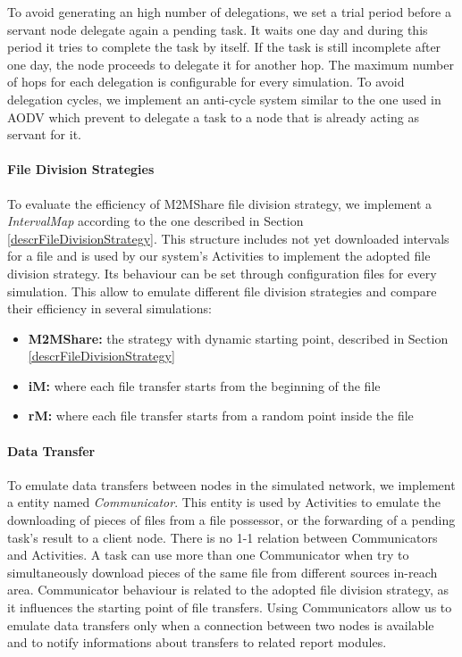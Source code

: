 To avoid generating an high number of delegations, we set a trial period before a servant node delegate again a pending task. It waits one day and during this period it tries to complete the task by itself. If the task is still incomplete after one day, the node proceeds to delegate it for another hop. The maximum number of hops for each delegation is configurable for every simulation. To avoid delegation cycles, we implement an anti-cycle system similar to the one used in AODV \cite{aodv} which prevent to delegate a task to a node that is already acting as servant for it. 

\paragraph{File Division Strategies}
To evaluate the efficiency of M2MShare file division strategy, we implement a \textit{IntervalMap} according to the one described in Section \ref{descrFileDivisionStrategy}. This structure includes not yet downloaded intervals for a file and is used by our system's Activities to implement the adopted file division strategy. Its behaviour can be set through configuration files for every simulation. This allow to emulate different file division strategies and compare their efficiency in several simulations:
\begin{itemize}
\item \textbf{M2MShare:} the strategy with dynamic starting point, described in Section \ref{descrFileDivisionStrategy}
\item \textbf{iM:} where each file transfer starts from the beginning of the file
\item \textbf{rM:} where each file transfer starts from a random point inside the file
\end{itemize}


\paragraph{Data Transfer}
To emulate data transfers between nodes in the simulated network, we implement a entity named \textit{Communicator}. This entity is used by Activities to emulate the downloading of pieces of files from a file possessor, or the forwarding of a pending task's result to a client node. There is no 1-1 relation between Communicators and Activities. A task can use more than one Communicator when try to simultaneously download pieces of the same file from different sources in-reach area. Communicator behaviour is related to the adopted file division strategy, as it influences the starting point of file transfers. Using Communicators allow us to emulate data transfers only when a connection between two nodes is available and to notify informations about transfers to related report modules.

